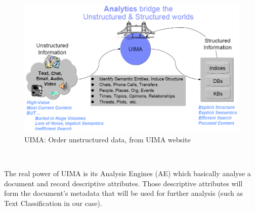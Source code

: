 \
\begin{figure}[H]
    \centering
    \includegraphics[width=1\textwidth]{fig/uima.png}
    \caption[Short caption]{UIMA: Order unstructured data, from UIMA website \cite{uima:Online}}
    \label{fig:uima}
\end{figure}
\

The real power of UIMA is its Analysis Engines (AE) which basically analyse a document and record descriptive attributes. Those descriptive attributes will form the document's metadata that will be used for further analysis (such as Text Classification in our case).

